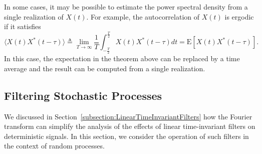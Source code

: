 In some cases, it may be possible to estimate the power spectral density from a single realization of $X(t)$.
For example, the autocorrelation of $X(t)$ is ergodic if it satisfies
\begin{equation*}
\langle X(t) X^* (t-\tau) \rangle \triangleq \lim_{T \rightarrow \infty} \frac{1}{T} \int_{- \frac{T}{2}}^{\frac{T}{2}} X(t) X^* (t-\tau) dt = \mathrm{E} \left[ X(t) X^*(t-\tau) \right].
\end{equation*}
In this case, the expectation in the theorem above can be replaced by a time average and the result can be computed from a single realization.

\subsection{Filtering Stochastic Processes}

We discussed in Section~\ref{subsection:LinearTimeInvariantFilters} how the Fourier transform can simplify the analysis of the effects of linear time-invariant filters on deterministic signals.
In this section, we consider the operation of such filters in the context of random processes.

